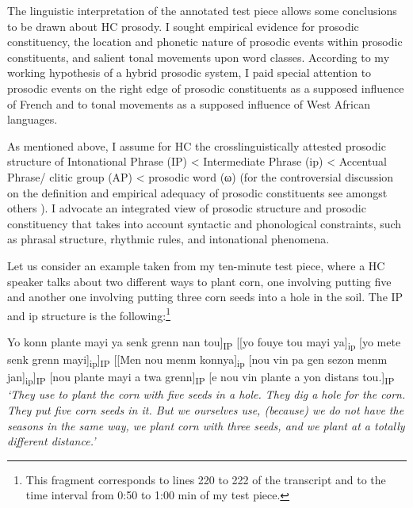 \documentclass[output=paper]{langsci/langscibook}
\begin{document}
The linguistic interpretation of the annotated test piece allows some conclusions to be drawn about HC prosody. I sought empirical evidence for prosodic constituency, the location and phonetic nature of prosodic events within prosodic constituents, and salient tonal movements upon word classes. According to my working hypothesis of a hybrid prosodic system, I paid special attention to prosodic events on the right edge of prosodic constituents as a supposed influence of French and to tonal movements as a supposed influence of West African languages.

As mentioned above, I assume for HC the crosslinguistically attested prosodic structure of Intonational Phrase (IP) < Intermediate Phrase (ip) < Accentual Phrase/ clitic group (AP) < prosodic word (ω) (for the controversial discussion on the definition and empirical adequacy of prosodic constituents see amongst others \citealt{Nespor2007,Ladd2008,Frota2012}). I advocate an integrated view of prosodic structure and prosodic constituency that takes into account syntactic and phonological constraints, such as phrasal structure, rhythmic rules, and intonational phenomena. 

Let us consider an example taken from my ten-minute test piece, where a HC speaker talks about two different ways to plant corn, one involving putting five and another one involving putting three corn seeds into a hole in the soil. The IP and ip structure is the following:\footnote{This fragment corresponds to lines 220 to 222 of the transcript and to the time interval from 0:50 to 1:00 min of my test piece.}

\ea \label{ex:kal:1}
\glt {[}Yo konn plante mayi ya senk grenn nan tou{]}\textsubscript{IP} {[}{[}yo fouye tou mayi ya{]}\textsubscript{ip} {[}yo mete senk grenn mayi{]}\textsubscript{ip}{]}\textsubscript{IP} {[}{[}Men nou menm konnya{]}\textsubscript{ip} {[}nou vin pa gen sezon menm jan{]}\textsubscript{ip}{]}\textsubscript{IP} {[}nou plante mayi a twa grenn{]}\textsubscript{IP} {[}e nou vin plante a yon distans tou.{]}\textsubscript{IP}
\\
\glt \textit{‘They use to plant the corn with five seeds in a hole. They dig a hole for the corn. They put five corn seeds in it. But we ourselves use, (because) we do not have the seasons in the same way, we plant corn with three seeds, and we plant at a totally different distance.’}
\z
\end{document}
